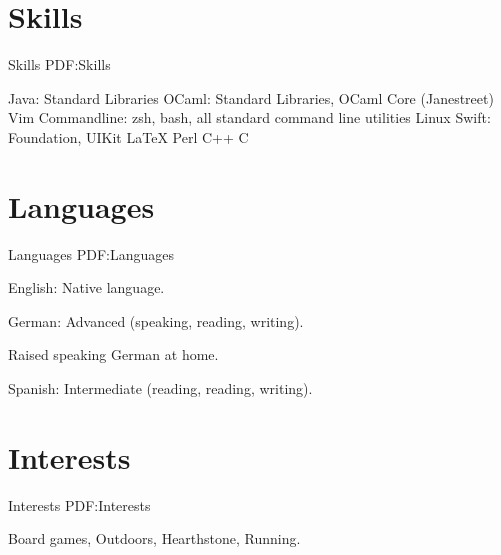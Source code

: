 \documentclass[letterpaper,10pt,oneside]{simpleresumecv}
\newcommand{\CVNote}{Resume compiled on {\today} for Apple}
\begin{document}
\begin{body}
\section%
{Skills}
{Skills}
{PDF:Skills}

\BulletItem%
Java: Standard Libraries
\BulletItem%
OCaml: Standard Libraries, OCaml Core (Janestreet)
\BulletItem%
Vim
\BulletItem%
Commandline: zsh, bash, all standard command line utilities
\BulletItem%
Linux
\BulletItem%
Swift: Foundation, UIKit
\BulletItem%
{\LaTeX}
\BulletItem%
Perl
\BulletItem%
C++
\BulletItem%
C


\section%
{Languages}
{Languages}
{PDF:Languages}

\BulletItem%
English: Native language.

\GapNoBreak%
\BulletItem%
German: Advanced (speaking, reading, writing).
\begin{detail}
\SubBulletItem%
Raised speaking German at home.
\end{detail}

\GapNoBreak%
\BulletItem%
Spanish: Intermediate (reading, reading, writing).


\section%
{Interests}
{Interests}
{PDF:Interests}

Board games,
Outdoors,
Hearthstone,
Running.

\end{body}


\label{LastPage}~%
\end{document}
